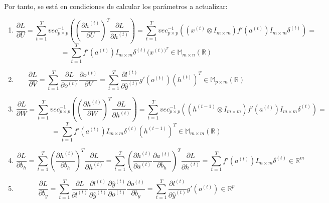 \documentclass[12pt,twoside]{article}
\begin{document}
Por tanto, se está en condiciones de calcular los parámetros a actualizar: 

\begin{enumerate}
    \item \[\frac{\partial L}{\partial U} = \sum_{t=1}^{T} vec_{p \times p}^{-1} \left( \left( \frac{\partial h^{(t)}}{\partial U} \right)^T \frac{\partial L}{\partial h^{(t)}} \right) = \sum_{t=1}^{T} vec_{p \times p}^{-1} \left( (x^{(t)} \otimes I_{m \times m}) f'(a^{(t)}) I_{m \times m} \delta^{(t)} \right) =
    \]
    \begin{equation}
    = \sum_{t=1}^{T}f'(a^{(t)}) I_{m \times m}\delta^{(t)}(x^{(t))^T} \in \mathbb{M}_{m \times n}(\mathbb{R})
    \end{equation}
    \item \begin{equation} \frac{\partial L}{\partial V} = \sum_{t=1}^{T} \frac{\partial L}{\partial o^{(t)}} \frac{\partial o^{(t)}}{\partial V} = \sum_{t=1}^{T} \frac{\partial l^{(t)}}{\partial \hat{y}^{(t)}} g'(o^{(t)})(h^{(t)})^T \in \mathbb{M}_{p \times m}(\mathbb{R})
    \end{equation}
    \item \[ \frac{\partial L}{\partial W} = \sum_{t=1}^{T} vec_{p \times p}^{-1} \left( \left( \frac{\partial h^{(t)}}{\partial W} \right)^T \frac{\partial L}{\partial h^{(t)}} \right) = \sum_{t=1}^{T} vec_{p \times p}^{-1} \left( (h^{(t-1)} \otimes I_{m \times m}) f'(a^{(t)}) I_{m \times m} \delta^{(t)} \right) =
    \]
    \begin{equation}
    = \sum_{t=1}^{T}f'(a^{(t)}) I_{m \times m}\delta^{(t)}(h^{(t-1)})^T \in \mathbb{M}_{m \times m}(\mathbb{R})
    \end{equation}
    \item \begin{equation} \frac{\partial L}{\partial b_h} = \sum_{t=1}^{T} \left( \frac{\partial h^{(t)}}{\partial b_h}\right)^T \frac{\partial L}{\partial h^{(t)}} = \sum_{t=1}^{T} \left( \frac{\partial h^{(t)}}{\partial a^{(t)}} \frac{\partial a^{(t)}}{\partial b_h}\right)^T \frac{\partial L}{\partial h^{(t)}} =
    \sum_{t=1}^{T} f'(a^{(t)}) I_{m \times m} \delta^{(t)} \in \mathbb{R}^m
    \end{equation}
    \item \begin{equation} \frac{\partial L}{\partial b_y} = \sum_{t=1}^{T} \frac{\partial L}{\partial l^{(t)}} \frac{\partial l^{(t)}}{\partial \hat{y}^{(t)}} \frac{\partial \hat{y}^{(t)}}{\partial o^{(t)}} \frac{\partial o^{(t)}}{\partial b_y} = \sum_{t=1}^{T} \frac{\partial l^{(t)}}{\partial \hat{y}^{(t)}} g'(o^{(t)}) \in \mathbb{R}^p
    \end{equation}

\end{enumerate}
\end{document}
